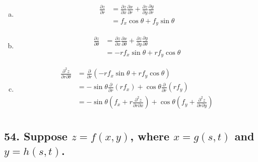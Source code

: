 \documentclass{article}
\begin{document}
    \begin{enumerate}[(a)]
        \item 
        $$\begin{aligned}
            \frac{\partial z}{\partial r} &= \frac{\partial z}{\partial x}\frac{\partial x}{\partial r} + \frac{\partial z}{\partial y}\frac{\partial y}{\partial r} \\
            &= f_x\cos \theta + f_y\sin \theta
        \end{aligned}$$

        \item 
        $$\begin{aligned}
            \frac{\partial z}{\partial \theta} &= \frac{\partial z}{\partial x}\frac{\partial x}{\partial \theta} + \frac{\partial z}{\partial y}\frac{\partial y}{\partial \theta} \\
            &= -rf_x\sin \theta + rf_y\cos \theta
        \end{aligned}$$

        \item 
        $$\begin{aligned}
            \frac{\partial^2 z}{\partial r \partial \theta} &= \frac{\partial }{\partial r}(-rf_x\sin \theta + rf_y \cos \theta) \\
            &= -\sin \theta \frac{\partial }{\partial r}(rf_x) + \cos \theta \frac{\partial }{\partial r}(rf_y) \\
            &= -\sin \theta (f_x + r\frac{\partial^2 z}{\partial r \partial x}) + \cos \theta (f_y + \frac{\partial^2 z}{\partial r \partial y}) \\
        \end{aligned}$$
    \end{enumerate}

    \subsection*{54. Suppose $z = f(x, y)$, where $x = g(s, t)$ and $y = h(s, t)$.}
\end{document}
